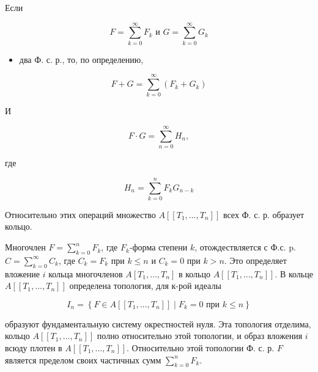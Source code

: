 \documentclass[10pt]{article}
\begin{document}
Если



\[

F=\sum_{k=0}^{\infty} F_{k} \text { и } G=\sum_{k=0}^{\infty} G_{k}

\]



\begin{itemize}

  \item два Ф. с. р., то, по определению,

\end{itemize}



\[

F+G=\sum_{k=0}^{\infty}\left(F_{k}+G_{k}\right)

\]



И



\[

F \cdot G=\sum_{n=0}^{\infty} H_{n},

\]



где



\[

H_{n}=\sum_{k=0}^{n} F_{k} G_{n-k}

\]



Относительно этих операций множество $A\left[\left[T_{1}, \ldots, T_{n}\right]\right]$ всех Ф. с. р. образует кольцо.



Многочлен $F=\sum_{k=0}^{n} F_{k}$, где $F_{k}$-форма степени $k$, отождествляется с Ф.с. p. $C=\sum_{k=0}^{\infty} C_{k}$, где $C_{k}=F_{k}$ при $k \leqslant n$ и $C_{k}=0$ при $k>n$. Это определяет вложение $i$ кольца многочленов $A\left[T_{1}, \ldots, T_{n}\right]$ в кольцо $A\left[\left[T_{1}, \ldots, T_{n}\right]\right]$. В кольце $A\left[\left[T_{1}, \ldots, T_{n}\right]\right]$ определена топология, для к-рой идеалы



\[

I_{n}=\left\{F \in A\left[\left[T_{1}, \ldots, T_{n}\right]\right] \mid F_{k}=0 \text { при } k \leqslant n\right\}

\]



образуют фундаментальную систему окрестностей нуля. Эта топология отделима, кольцо $A\left[\left[T_{1}, \ldots, T_{n}\right]\right]$ полно относительно этой топологии, и образ вложения $i$ всюду плотен в $A\left[\left[T_{1}, \ldots, T_{n}\right]\right]$. Относительно этой топологии Ф. с. р. $F$ является пределом своих частичных сумм $\sum_{k=0}^{n} F_{k}$.
\end{document}
